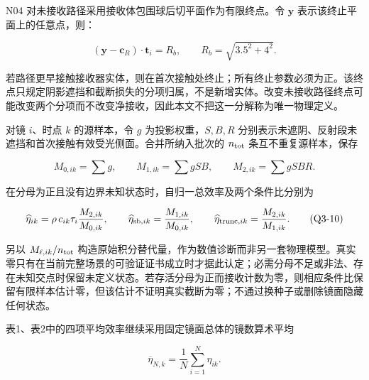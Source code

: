 \documentclass[UTF8,fontset=windows,zihao=-4]{ctexart}
\begin{document}
\par\noindent\begin{minipage}{\linewidth}
N04 对未接收路径采用接收体包围球后切平面作为有限终点。令 \(\boldsymbol y\) 表示该终止平面上的任意点，则：

\[
(\boldsymbol y-\boldsymbol c_R)\cdot\boldsymbol t_i=R_b,
\qquad
R_b=\sqrt{3.5^2+4^2}.
\tag{Q3-8}
\]
\end{minipage}\par

若路径更早接触接收器实体，则在首次接触处终止；所有终止参数必须为正。该终点只规定阴影遮挡和截断损失的分项归属，不是新增实体。改变未接收路径终点可能改变两个分项而不改变净接收，因此本文不把这一分解称为唯一物理定义。

\par\noindent\begin{minipage}{\linewidth}
对镜 \(i\)、时点 \(k\) 的源样本，令 \(g\) 为投影权重，\(S,B,R\) 分别表示未遮阴、反射段未遮挡和首次接触有效受光侧面。合并所纳入批次的 \(n_{\rm tot}\) 条互不重复源样本，保存

\[
M_{0,ik}=\sum g,\qquad
M_{1,ik}=\sum gSB,\qquad
M_{2,ik}=\sum gSBR .
\tag{Q3-9}
\]
\end{minipage}\par

\par\noindent\begin{minipage}{\linewidth}
在分母为正且没有边界未知状态时，自归一总效率及两个条件比分别为

\[
\widehat\eta_{ik}
=\rho\,c_{ik}\tau_i\frac{M_{2,ik}}{M_{0,ik}},
\qquad
\widehat\eta_{{\rm sb},ik}=\frac{M_{1,ik}}{M_{0,ik}},
\qquad
\widehat\eta_{{\rm trunc},ik}=\frac{M_{2,ik}}{M_{1,ik}} .
\tag{Q3-10}
\]
\end{minipage}\par

另以 \(M_{\ell,ik}/n_{\rm tot}\) 构造原始积分替代量，作为数值诊断而非另一套物理模型。真实零只有在当前完整场景的可验证证书成立时才据此认定；必需分母不足或非法、存在未知交点时保留未定义状态。若存活分母为正而接收计数为零，则相应条件比保留有限样本估计零，但该估计不证明真实截断为零；不通过换种子或删除镜面隐藏任何状态。

\par\noindent\begin{minipage}{\linewidth}
表1、表2中的四项平均效率继续采用固定镜面总体的镜数算术平均

\[
\overline\eta_{N,k}=\frac1N\sum_{i=1}^{N}\eta_{ik}.
\tag{Q3-11}
\]
\end{minipage}\par
\end{document}
